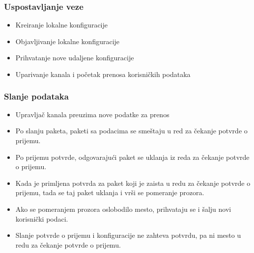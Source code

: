 \documentclass{beamer}
\begin{document}
    \begin{frame}
        \frametitle{Uspostavljanje veze}

        \begin{itemize}
            \item{Kreiranje lokalne konfiguracije}
            \item{Objavljivanje lokalne konfiguracije}
            \item{Prihvatanje nove udaljene konfiguracije}
            \item{Uparivanje kanala i početak prenosa korisničkih podataka}
        \end{itemize}
    \end{frame}


    \begin{frame}
        \frametitle{Slanje podataka}

        \begin{itemize}
            \item{Upravljač kanala preuzima nove podatke za prenos}
            \item{Po slanju paketa, paketi sa podacima se smeštaju u
                    red za čekanje potvrde o prijemu.}
            \item{Po prijemu potvrde, odgovarajući paket se uklanja iz
                    reda za čekanje potvrde o prijemu.}
            \item{Kada je primljena potvrda za paket koji je zaista u
                    redu za čekanje potvrde o prijemu, tada se taj
                    paket uklanja i vrši se pomeranje prozora.}
            \item{Ako se pomeranjem prozora oslobodilo mesto,
                    prihvataju se i šalju novi korisnički podaci.}
            \item{Slanje potvrde o prijemu i konfiguracije ne zahteva potvrdu,
                    pa ni mesto u redu za čekanje potvrde o prijemu.}
        \end{itemize}
    \end{frame}
\end{document}
